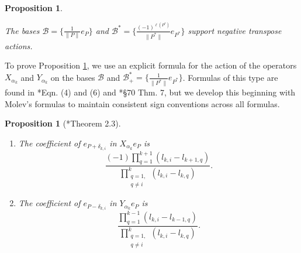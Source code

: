 \documentclass{amsart}[12pt]
\newtheorem{proposition}[theorem]{Proposition}
\theoremstyle{definition}
\numberwithin{equation}{section}
\begin{document}
\begin{proposition} \label{prop: negative transpose actions}

The bases $\mathscr{B} = \{ \frac{1}{\|P \|} e_{P}\} $ and
$\mathscr{B}^{*} = \{ \frac{(-1)^{\ell(P^{*})}}{\|  P^{*} \|}
e_{P^{*}} \}$ support
negative transpose actions.

\end{proposition}



To prove Proposition \ref{prop: negative transpose actions}, we use an
explicit formula for the action of the operators $X_{\alpha_k}$ and $Y_{\alpha_k}$ on
the bases $\mathscr{B}$ and $\mathscr{B}_{+}^{*} = \{ \frac{1}{\|  P^{*} \|}
e_{P^{*}} \}$. Formulas of this
type are found in \cite{GT}*{Eqn. (4) and (6)} and \cite{Z}*{\S 70 Thm. 7}, but
we develop this beginning with Molev's formulas to maintain consistent 
sign conventions across all formulas. 

\begin{proposition}[\cite{Molev2006}*{Theorem 2.3}] \label{prop: Molev
    action} \mbox{}
  \begin{enumerate}
    \item The coefficient of $e_{P + \delta_{k,i}}$ in $X_{\alpha_k} e_P$ is 
  \[
    \frac{(-1)
      \displaystyle \prod_{q=1}^{k+1}
      (l_{k,i}-l_{k+1,q})}{\displaystyle \prod_{\substack{q=1,\\q\neq i}}^{k} (l_{k,i}-l_{k,q})}.
    \]
  \item The coefficient of $e_{P - \delta_{k,i}}$ in $Y_{\alpha_k} e_P$ is 
      \[
    \frac{
      \displaystyle \prod_{q=1}^{k-1}
      (l_{k,i}-l_{k-1,q})}{\displaystyle \prod_{\substack{q=1,\\q\neq i}}^{k} (l_{k,i}-l_{k,q})}.
    \]
    \end{enumerate}
\end{proposition}
\end{document}
